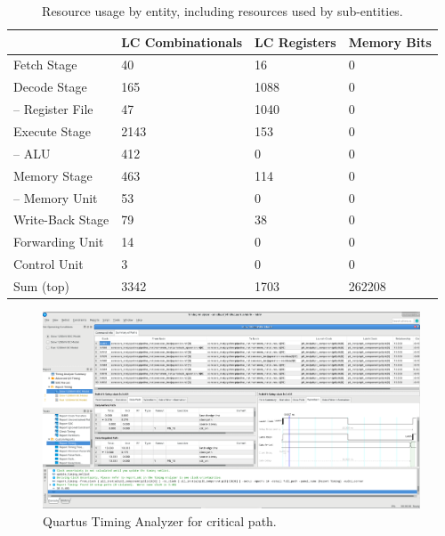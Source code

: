 \begin{table}[htb]
  \centering
  \caption{Resource usage by entity, including resources used by sub-entities.}
  \begin{tabular}{llll}
    \toprule
                         & LC Combinationals & LC Registers & Memory Bits \\
    \midrule
    Fetch Stage          &  40          & 16       & 0            \\
    Decode Stage         &  165         & 1088     & 0            \\
    -- Register File     &  47          & 1040     & 0            \\
    Execute Stage        &  2143        & 153      & 0            \\
    -- ALU               &  412         & 0        & 0            \\
    Memory Stage         &  463         & 114      & 0            \\
    -- Memory Unit       &  53          & 0        & 0            \\
    Write-Back Stage     &  79          & 38       & 0            \\
    Forwarding Unit      &  14          & 0        & 0            \\
    Control Unit         &  3           & 0        & 0            \\
    \cmidrule{1-4}
    Sum (top)            &  3342        & 1703     & 262208       \\
    \bottomrule
  \end{tabular}
\end{table}

\begin{qa}
  \begin{figure}[ht!]
  	\centering
  	\includegraphics[width=1.0\linewidth]{img/criticalpath.png}
  	\caption{Quartus Timing Analyzer for critical path.}
  	\label{fig:sim2}
  \end{figure}
\end{qa}

